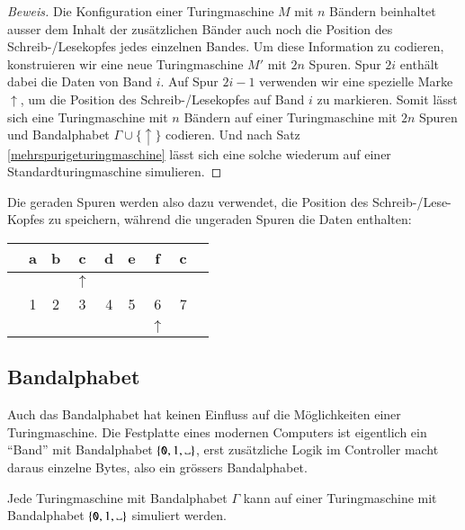 \begin{proof}[Beweis]
Die Konfiguration einer Turingmaschine $M$ mit $n$ Bändern beinhaltet
ausser dem Inhalt der zusätzlichen Bänder auch noch die Position
des Schreib-/Lesekopfes jedes einzelnen Bandes. Um diese Information
zu codieren, konstruieren wir eine neue Turingmaschine $M'$ mit
$2n$ Spuren. Spur $2i$ enthält dabei die Daten von Band $i$.
Auf Spur $2i-1$ verwenden wir eine spezielle Marke $\uparrow$, um die Position
des Schreib-/Lesekopfes auf Band $i$ zu markieren. Somit lässt sich
eine Turingmaschine mit $n$ Bändern auf einer Turingmaschine mit
$2n$ Spuren und Bandalphabet $\Gamma\cup\{\uparrow\}$ codieren.
Und nach Satz \ref{mehrspurigeturingmaschine} lässt sich eine solche wiederum
auf einer Standardturingmaschine simulieren.
\end{proof}
Die geraden Spuren werden also dazu verwendet, die Position des
Schreib-/Lese-Kopfes zu speichern, während die ungeraden Spuren
die Daten enthalten:
\begin{center}
\begin{tabular}{c|c|c|c|c|c|c|c|c}
\hline
&a&b&c&d&e&f&c&\\
\hline
& & &$\uparrow$& & & & &\\
\hline
&1&2&3&4&5&6&7&\\
\hline
& & & & & &$\uparrow$& &\\
\hline
\end{tabular}
\end{center}

\subsection{Bandalphabet}
Auch das Bandalphabet hat keinen Einfluss auf die Möglichkeiten einer
Turingmaschine. Die Festplatte eines modernen Computers ist eigentlich
ein ``Band'' mit Bandalphabet $\{\texttt{0},1,\blank\}$, erst zusätzliche
Logik im Controller macht daraus einzelne Bytes, also ein grössers
Bandalphabet.

\begin{satz}
Jede Turingmaschine mit Bandalphabet $\Gamma$ kann auf einer Turingmaschine
mit Bandalphabet $\{\texttt{0},1,\blank\}$ simuliert werden.
\end{satz}


